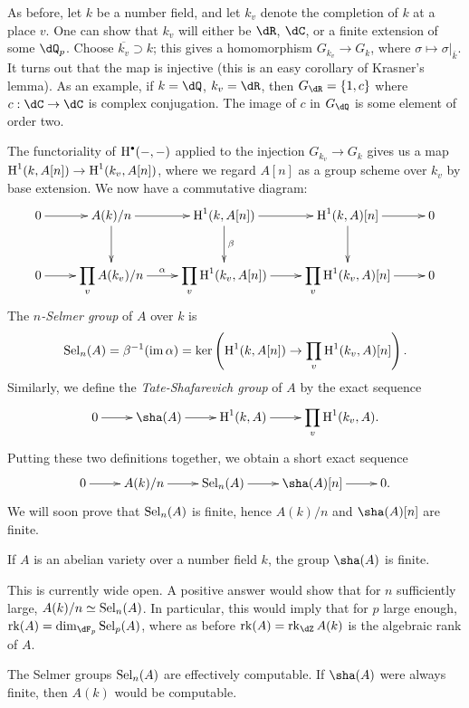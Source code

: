 As before, let $k$ be a number field, and let $k_v$ denote the completion of 
$k$ at a place $v$. One can show that $k_v$ will either be $\dR$, $\dC$, or a 
finite extension of some $\dQ_p$. Choose $\overline{k_v}\supset k$; this gives 
a homomorphism $G_{k_v} \to G_k$, where $\sigma\mapsto \sigma|_{\bar k}$. It 
turns out that the map is injective (this is an easy corollary of Krasner's 
lemma). As an example, 
if $k=\dQ$, $k_v=\dR$, then $G_{\dR}=\{1,c\}$ where $c:\dC\to \dC$ is complex 
conjugation. The image of $c$ in $G_\dQ$ is some element of order two. 

The functoriality of $\h^\bullet(-,-)$ applied to the injection $G_{k_v} \to G_k$ 
gives us a map $\operatorname{H}^1(k,A[n]) \to \operatorname{H}^1(k_v,A[n])$, where we regard $A[n]$ as a 
group scheme over $k_v$ by base extension. We now have a commutative diagram: 
\[\xymatrix{
  0 \ar[r] 
    & A(k)/n \ar[r] \ar[d] 
    & \h^1(k,A[n]) \ar[r] \ar[d]^-\beta 
    & \h^1(k,A)[n] \ar[r] \ar[d] 
    & 0 \\
  0 \ar[r] 
    & \displaystyle\prod_v A(k_v)/n \ar[r]^-\alpha 
    & \displaystyle\prod_v \h^1(k_v,A[n]) \ar[r] 
    & \displaystyle\prod_v \h^1(k_v,A)[n] \ar[r] 
    & 0
}\]
The \emph{$n$-Selmer group} of $A$ over $k$ is 
\begin{align*}
  \operatorname{Sel}_n(A) = \beta^{-1}(\operatorname{im} \alpha) 
    = \ker\left(\operatorname{H}^1(k,A[n]) \to \prod_v \operatorname{H}^1(k_v,A)[n]\right) \text{.}
\end{align*}
Similarly, we define the \emph{Tate-Shafarevich group} of $A$ by the exact 
sequence 
\[\xymatrix{
  0 \ar[r] 
    & \sha(A) \ar[r] 
    & \h^1(k,A) \ar[r]
    & \displaystyle\prod_v \h^1(k_v,A) \text{.}
}\]
Putting these two definitions together, we obtain a short exact 
sequence 
\[\xymatrix{
  0 \ar[r] 
    & A(k)/n \ar[r] 
    & \selmer_n(A) \ar[r] 
    & \sha(A)[n] \ar[r] 
    & 0 \text{.}
}\]
We will soon prove that $\operatorname{Sel}_n(A)$ is finite, hence $A(k)/n$ and 
$\sha(A)[n]$ are finite. 

\begin{conjecture}
If $A$ is an abelian variety over a number field $k$, the group 
$\sha(A)$ is finite. 
\end{conjecture}
This is currently wide open. A positive answer would show that for $n$ sufficiently 
large, $A(k)/n \simeq \operatorname{Sel}_n(A)$. In particular, this would imply that for $p$ 
large enough, $\rank(A) = \dim_{\dF_p} \selmer_p(A)$, where as before 
$\rank(A) = \rank_\dZ A(k)$ is the algebraic rank of 
$A$. 

The Selmer groups $\operatorname{Sel}_n(A)$ are effectively computable. If $\sha(A)$ were 
always finite, then $A(k)$ would be computable. 





